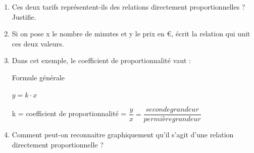 \documentclass[../../syllabus_2.tex]{subfiles}
\begin{document}
\begin{enumerate}
    \item Ces deux tarifs représentent-ils des relations directement proportionnelles ? Justifie.

\hskip -20pt


    \item Si on pose x le nombre de minutes et y le prix en €, écrit la relation qui unit ces deux valeurs. 

    \item Dans cet exemple, le coefficient de proportionnalité vaut :

\hskip -20pt
Formule générale
    \begin{center}
    $ y = k \cdot x$
    \end{center}
    
    \begin{center}
    k = coefficient de proportionnalité = $\dfrac{y}{x}= \dfrac{seconde grandeur}{permière grandeur}$
    \end{center}

    \item Comment peut-on reconnaitre graphiquement qu'il s'agit d'une relation directement proportionnelle ? 
\end{enumerate}
\end{document}

